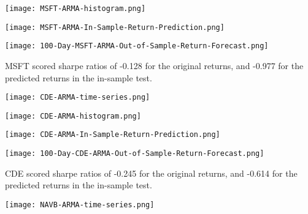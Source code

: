 \begin{center}
    \texttt{[image: MSFT-ARMA-histogram.png]}
    \label{fig:nonfloat}
\end{center}

\begin{center}
    \texttt{[image: MSFT-ARMA-In-Sample-Return-Prediction.png]}
    \label{fig:nonfloat}
\end{center}

\begin{center}
    \texttt{[image: 100-Day-MSFT-ARMA-Out-of-Sample-Return-Forecast.png]}
    \label{fig:nonfloat}
\end{center}

MSFT scored sharpe ratios of -0.128 for the original returns, and -0.977 for the predicted returns in the in-sample test.

\begin{center}
    \texttt{[image: CDE-ARMA-time-series.png]}
    \label{fig:nonfloat}
\end{center}

\begin{center}
    \texttt{[image: CDE-ARMA-histogram.png]}
    \label{fig:nonfloat}
\end{center}

\begin{center}
    \texttt{[image: CDE-ARMA-In-Sample-Return-Prediction.png]}
    \label{fig:nonfloat}
\end{center}

\begin{center}
    \texttt{[image: 100-Day-CDE-ARMA-Out-of-Sample-Return-Forecast.png]}
    \label{fig:nonfloat}
\end{center}

CDE scored sharpe ratios of -0.245 for the original returns, and -0.614 for the predicted returns in the in-sample test.

\begin{center}  
    \texttt{[image: NAVB-ARMA-time-series.png]}
    \label{fig:nonfloat}
\end{center}

